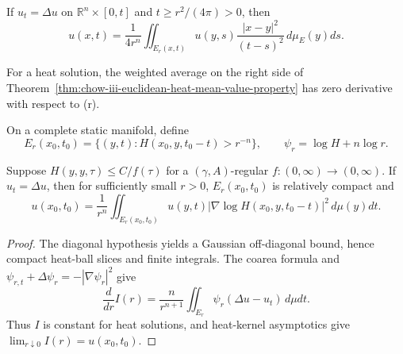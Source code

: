 \begin{theorem}
\label{thm:chow-iii-euclidean-heat-mean-value-property}
If \(u_t=\Delta u\) on \(\mathbb R^n\times[0,t]\) and
\(t\ge r^2/(4\pi)>0\), then
\[
 u(x,t)=\frac1{4r^n}\iint_{E_r(x,t)}u(y,s)
 \frac{|x-y|^2}{(t-s)^2}\,d\mu_E(y)ds.
\]
\end{theorem}

\begin{lemma}
\label{lem:chow-iii-euclidean-heat-ball-average-stationary}
For a heat solution, the weighted average on the right side of
Theorem~\ref{thm:chow-iii-euclidean-heat-mean-value-property} has zero
derivative with respect to (r).
\end{lemma}

On a complete static manifold, define
\[
 E_r(x_0,t_0)=\{(y,t):H(x_0,y,t_0-t)>r^{-n}\},
 \qquad \psi_r=\log H+n\log r.
\]

\begin{theorem}
\label{thm:chow-iii-riemannian-heat-mean-value-property}
Suppose \(H(y,y,\tau)\le C/f(\tau)\) for a \((\gamma,A)\)-regular
\(f:(0,\infty)\to(0,\infty)\).  If \(u_t=\Delta u\), then for sufficiently
small \(r>0\), \(E_r(x_0,t_0)\) is relatively compact and
\[
 u(x_0,t_0)=\frac1{r^n}\iint_{E_r(x_0,t_0)}u(y,t)
 |\nabla\log H(x_0,y,t_0-t)|^2\,d\mu(y)dt.
\]
\end{theorem}
\begin{proof}
\sketch The diagonal hypothesis yields a Gaussian off-diagonal bound, hence compact
heat-ball slices and finite integrals.  The coarea formula and
\(\psi_{r,t}+\Delta\psi_r=-|\nabla\psi_r|^2\) give
\[
 \frac d{dr}I(r)=\frac n{r^{n+1}}\iint_{E_r}\psi_r(\Delta u-u_t)\,d\mu dt.
\]
Thus \(I\) is constant for heat solutions, and heat-kernel asymptotics give
\(\lim_{r\downarrow0}I(r)=u(x_0,t_0)\).
\end{proof}

